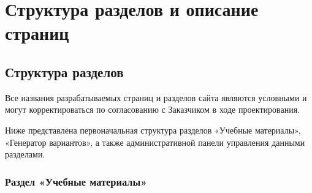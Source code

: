 \section{Структура разделов и описание страниц}
\subsection{Структура разделов}
Все названия разрабатываемых страниц и разделов сайта являются условными и могут корректироваться по согласованию с Заказчиком в ходе проектирования.

Ниже представлена первоначальная структура разделов «Учебные материалы», «Генератор вариантов», а также административной панели управления данными разделами.

\subsubsection{Раздел «Учебные материалы»}
